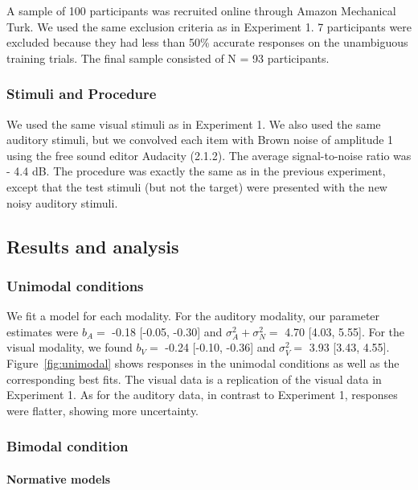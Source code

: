 \documentclass[english,floatsintext,man]{apa6}
\theoremstyle{definition}
\theoremstyle{definition}
\theoremstyle{definition}
\theoremstyle{remark}
\begin{document}
A sample of 100 participants was recruited online through Amazon
Mechanical Turk. We used the same exclusion criteria as in Experiment 1.
7 participants were excluded because they had less than 50\% accurate
responses on the unambiguous training trials. The final sample consisted
of N = 93 participants.

\subsubsection{Stimuli and Procedure}\label{stimuli-and-procedure}

We used the same visual stimuli as in Experiment 1. We also used the
same auditory stimuli, but we convolved each item with Brown noise of
amplitude 1 using the free sound editor Audacity (2.1.2). The average
signal-to-noise ratio was - 4.4 dB. The procedure was exactly the same
as in the previous experiment, except that the test stimuli (but not the
target) were presented with the new noisy auditory stimuli.

\subsection{Results and analysis}\label{results-and-analysis-1}

\subsubsection{Unimodal conditions}\label{unimodal-conditions-1}

We fit a model for each modality. For the auditory modality, our
parameter estimates were \(b_A=\) -0.18 {[}-0.05, -0.30{]} and
\(\sigma^2_A+\sigma^2_N=\) 4.70 {[}4.03, 5.55{]}. For the visual
modality, we found \(b_V=\) -0.24 {[}-0.10, -0.36{]} and \(\sigma^2_V=\)
3.93 {[}3.43, 4.55{]}. Figure~\ref{fig:unimodal} shows responses in the
unimodal conditions as well as the corresponding best fits. The visual
data is a replication of the visual data in Experiment 1. As for the
auditory data, in contrast to Experiment 1, responses were flatter,
showing more uncertainty.

\subsubsection{Bimodal condition}\label{bimodal-condition-2}

\paragraph{Normative models}\label{normative-models-1}
\end{document}
